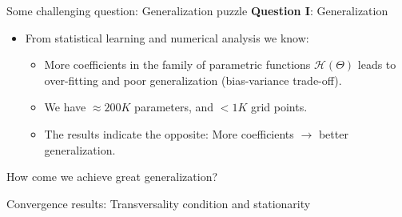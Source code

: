 \documentclass[aspectratio=169,10pt]{beamer}
\newcommand{\emphcolor}[1]{\textbf{\textcolor{emphcolorval}{#1}}}
\begin{document}
\begin{frame}{Some challenging question: Generalization puzzle}
	\emphcolor{Question I}: Generalization 
	\begin{itemize}
		\item From statistical learning and numerical analysis we know:\vspace{0.1in}
		\begin{itemize}
			\item More coefficients in the family of parametric functions $\mathcal{H}(\Theta)$ leads to over-fitting and poor generalization (bias-variance trade-off).\vspace{0.1in}
		  \item We have $\approx 200K$ parameters, and $<1K$ grid points.\vspace{0.1in}
			\item The results indicate the opposite: More coefficients $\rightarrow$ better generalization.  \vspace{0.1in}
		\end{itemize}
	\end{itemize}
How come we achieve great generalization?  
\end{frame}

\begin{frame}{Convergence results: Transversality condition and stationarity}
	\renewcommand{\arraystretch}{1.2}
	\begin{table}[h!]
		\caption{Simulating multiple seeds for different $\mathcal{H}(\Theta)$ with $\nu=1$}\vspace{-0.1in}
		\begin{center}
		\end{center}
	\end{table}
	
\end{frame}
\end{document}
